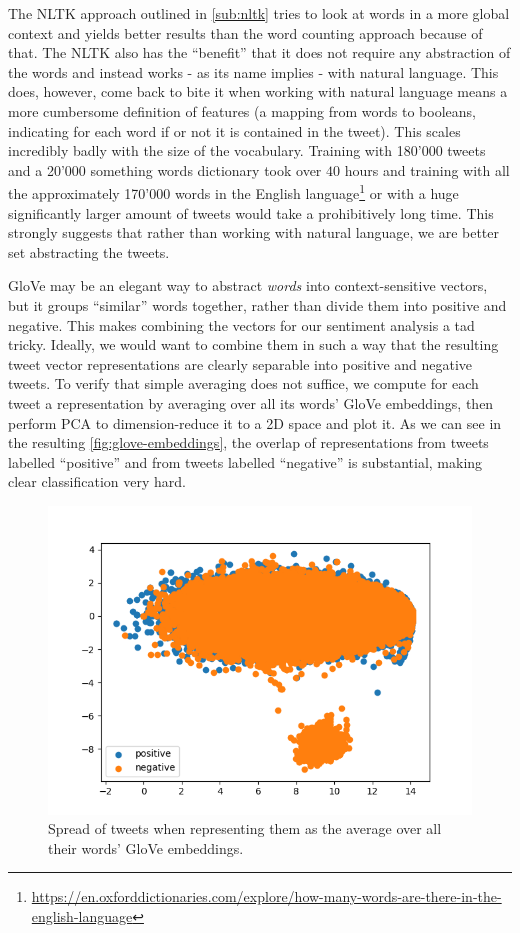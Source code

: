 \documentclass[10pt,conference,compsocconf]{IEEEtran}
\begin{document}
The NLTK approach outlined in \autoref{sub:nltk} tries to look at words in a more global context and yields better results than the word counting approach because of that. The NLTK also has the ``benefit'' that it does not require any abstraction of the words and instead works - as its name implies - with natural language. This does, however, come back to bite it when working with natural language means a more cumbersome definition of features (a mapping from words to booleans, indicating for each word if or not it is contained in the tweet). This scales incredibly badly with the size of the vocabulary. Training with 180'000 tweets and a 20'000 something words dictionary took over $40$ hours and training with all the approximately 170'000 words in the English language\footnote{\url{https://en.oxforddictionaries.com/explore/how-many-words-are-there-in-the-english-language}} or with a huge significantly larger amount of tweets would take a prohibitively long time. This strongly suggests that rather than working with natural language, we are better set abstracting the tweets.

GloVe may be an elegant way to abstract \textit{words} into context-sensitive vectors, but it groups ``similar'' words together, rather than divide them into positive and negative. This makes combining the vectors for our sentiment analysis a tad tricky. Ideally, we would want to combine them in such a way that the resulting tweet vector representations are clearly separable into positive and negative tweets. To verify that simple averaging does not suffice, we compute for each tweet a representation by averaging over all its words' GloVe embeddings, then perform PCA to dimension-reduce it to a 2D space and plot it. As we can see in the resulting \autoref{fig:glove-embeddings}, the overlap of representations from tweets labelled ``positive'' and from tweets labelled ``negative'' is substantial, making clear classification very hard.

\begin{figure}[htbp]
  \centering
  \includegraphics[width=\columnwidth]{imgs/glove_plot.png}
  \caption{Spread of tweets when representing them as the average over all their words' GloVe embeddings.}
  \label{fig:glove-embeddings}
\end{figure}
\end{document}
